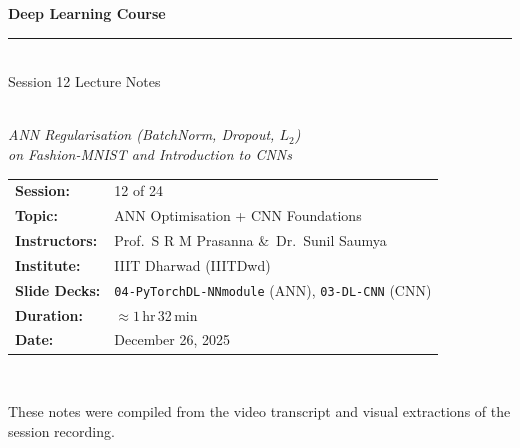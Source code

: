 \documentclass[12pt,a4paper]{article}
\newcommand{\Ltwo}{L_2}
\begin{document}
\begin{titlepage}
  \centering
  \vspace*{2cm}
  {\LARGE\bfseries Deep Learning Course\\[0.4em]
   \rule{\linewidth}{0.5pt}\\[0.6em]
   Session 12 Lecture Notes}\\[1.2em]
  {\large\itshape ANN Regularisation (BatchNorm, Dropout, $\Ltwo$)\\
   on Fashion-MNIST and Introduction to CNNs}\\[2em]
  \begin{tabular}{ll}
    \textbf{Session:}     & 12 of 24 \\[0.3em]
    \textbf{Topic:}       & ANN Optimisation + CNN Foundations \\[0.3em]
    \textbf{Instructors:} & Prof.\ S R M Prasanna \&\ Dr.\ Sunil Saumya \\[0.3em]
    \textbf{Institute:}   & IIIT Dharwad (IIITDwd) \\[0.3em]
    \textbf{Slide Decks:} & \texttt{04-PyTorchDL-NNmodule} (ANN),
                            \texttt{03-DL-CNN} (CNN) \\[0.3em]
    \textbf{Duration:}    & $\approx 1$\,hr\,32\,min \\[0.3em]
    \textbf{Date:}        & December 26, 2025 \\
  \end{tabular}\\[3em]
  \begin{abstract}
    \noindent
    Session 12 bridges the hands-on ANN experiments from Session 11 with the
    theoretical and practical foundations of Convolutional Neural Networks
    (CNNs).  The first hour is devoted to reviewing the three versions of the
    Fashion-MNIST ANN built in the previous session, identifying the
    overfitting gap (training accuracy 98\,\% vs.\ test accuracy 88\,\%),
    and introducing three complementary regularisation strategies:
    $\Ltwo$~weight-decay, Batch Normalisation, and Dropout.  An optimised
    fourth version combines all three remedies and achieves a tighter
    train/test gap ($93\,\% / 88\,\%$).  The second half of the session is
    presented by Prof.\ Prasanna, who motivates CNNs from first principles
    --- the spatial structure of image data, the history of the ImageNet
    challenge, and the fundamental distinction between matrix multiplication
    (used in ANNs) and the convolution operation (used in CNNs).
  \end{abstract}
  \vfill
  {\small These notes were compiled from the video transcript and visual
   extractions of the session recording.}
\end{titlepage}
\end{document}
